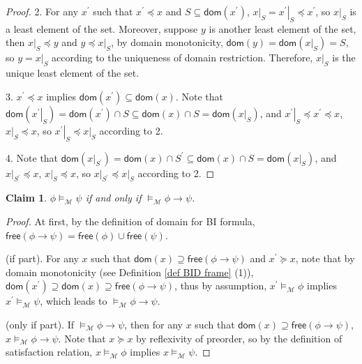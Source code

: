 \documentclass[conference,compsoc, 10pt]{IEEEtran}
\newtheorem{claim}{Claim}
\newcommand {\cM } {{\mathcal{M}}}
\newcommand {\Ldom }[1] {{\mathsf{dom}\!\left(#1\right)}}
\newcommand {\Lfree }[1] {{\mathsf{free}{\left(#1\right)}}}
\newcommand {\rt }[2] {{\left.{#1}\right|_{#2}}}
\begin{document}
\begin{appendices}
\begin{proof}
			2. For any $x^\prime$ such that $x^\prime\preceq x$ and $S\subseteq\Ldom{x^\prime}$, $\rt{x}{S} = \rt{x^\prime}{S} \preceq x^\prime$, so $\rt{x}{S}$ is a least element of the set. Moreover, suppose $y$ is another least element of the set, then $\rt{x}{S}\preceq y$ and $y\preceq \rt{x}{S}$, by domain monotonicity, $\Ldom{y} = \Ldom{\rt{x}{S}} = S$, so $y = \rt{x}{S}$ according to the uniqueness of domain restriction. Therefore, $\rt{x}{S}$ is the unique least element of the set.
			
			3. $x^\prime\preceq x$ implies $\Ldom{x^\prime}\subseteq\Ldom{x}$. Note that $\Ldom{\rt{x^\prime}{S}} = \Ldom{x^\prime}\cap S \subseteq \Ldom{x}\cap S = \Ldom{\rt{x}{S}}$, and $\rt{x^\prime}{S}\preceq x^\prime\preceq x$, $\rt{x}{S}\preceq x$, so $\rt{x^\prime}{S}\preceq \rt{x}{S}$ according to 2.
			
			4. Note that $\Ldom{\rt{x}{S^\prime}} = \Ldom{x}\cap S^\prime \subseteq \Ldom{x}\cap S = \Ldom{\rt{x}{S}}$, and $\rt{x}{S^\prime}\preceq x$, $\rt{x}{S}\preceq x$, so $\rt{x}{S^\prime}\preceq \rt{x}{S}$ according to 2.
		\end{proof}
		
		\vspace{0.5cm}
		
		\begin{claim}
			$\phi\models_\cM\psi$ if and only if $\models_\cM\phi\rightarrow\psi$.
		\end{claim}
		\begin{proof}
			At first, by the definition of domain for BI formula, $\Lfree{\phi\rightarrow\psi} = \Lfree{\phi}\cup\Lfree{\psi}$.
			
			(if part). For any $x$ such that $\Ldom{x}\supseteq\Lfree{\phi\rightarrow\psi}$ and $x^\prime\succeq x$, note that by domain monotonicity (see Definition \ref{def BID frame} (1)), $\Ldom{x^\prime}\supseteq\Ldom{x}\supseteq\Lfree{\phi\rightarrow\psi}$, thus by assumption, $x^\prime\models_\cM\phi$ implies $x^\prime\models_\cM\psi$, which leads to $\models_\cM \phi\rightarrow\psi$.
			
			(only if part). If $\models_\cM \phi\rightarrow\psi$, then for any $x$ such that $\Ldom{x}\supseteq\Lfree{\phi\rightarrow\psi}$, $x\models_\cM \phi\rightarrow\psi$. Note that $x\succeq x$ by reflexivity of preorder, so by the definition of satisfaction relation, $x\models_\cM\phi$ implies $x\models_\cM\psi$.
		\end{proof}
		
		\vspace{0.5cm}
		

\end{appendices}
\end{document}

